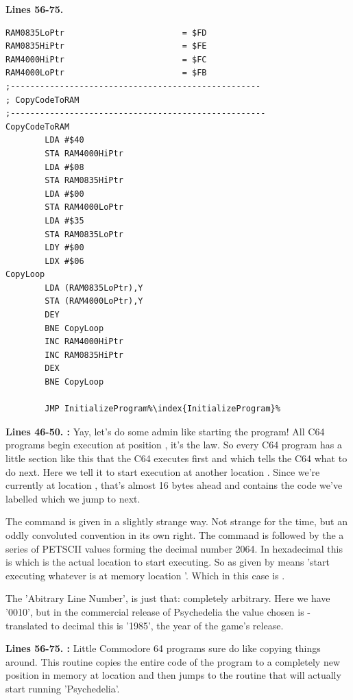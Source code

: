 \textbf{Lines 56-75. }
\begin{lstlisting}[caption=Some strictly unnecessary code copying,escapechar=\%]
RAM0835LoPtr                        = $FD
RAM0835HiPtr                        = $FE
RAM4000HiPtr                        = $FC
RAM4000LoPtr                        = $FB
;---------------------------------------------------
; CopyCodeToRAM
;----------------------------------------------------
CopyCodeToRAM
        LDA #$40
        STA RAM4000HiPtr
        LDA #$08
        STA RAM0835HiPtr
        LDA #$00
        STA RAM4000LoPtr
        LDA #$35
        STA RAM0835LoPtr
        LDY #$00                                 
        LDX #$06
CopyLoop   
        LDA (RAM0835LoPtr),Y
        STA (RAM4000LoPtr),Y
        DEY 
        BNE CopyLoop
        INC RAM4000HiPtr
        INC RAM0835HiPtr
        DEX 
        BNE CopyLoop

        JMP InitializeProgram%\index{InitializeProgram}%

\end{lstlisting}
\clearpage
{}
\textbf{Lines 46-50. :} Yay, let's do some admin like starting the program! All C64 programs 
begin execution at position , it's the law.
So every C64 program has a little section like this that the C64 executes first and which tells the C64 what to do next.
Here we tell it to start execution at another location . Since we're currently at location , that's
almost 16 bytes ahead and contains the code we've labelled  which we jump to next.

The command is given in a slightly strange way. Not strange for the time, but an oddly convoluted convention in its own right.
The  command is followed by the a series of PETSCII values forming the decimal number 2064. In hexadecimal this is
 which is the actual location to start executing. So  as given by 
means 'start executing whatever is at memory location '. Which in this case is .

The 'Abitrary Line Number', is just that: completely arbitrary. Here we have '0010', but in the commercial release of Psychedelia
the value chosen is  - translated to decimal this is '1985', the year of the game's release.

\bigskip
\bigskip
\textbf{Lines 56-75. :} Little Commodore 64 programs sure do like copying things around. This routine copies the entire code of the program to a
completely new position in memory at location  and then jumps to the routine  that will actually start running
'Psychedelia'.

